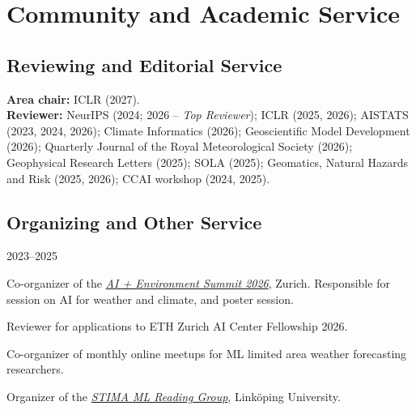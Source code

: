 \documentclass[11pt]{article}
\begin{document}
\section*{Community and Academic Service}
\subsection*{Reviewing and Editorial Service}
{\footnotesize
\textbf{Area chair:} ICLR (2027).\\
\textbf{Reviewer:} NeurIPS (2024; 2026 -- \textit{Top Reviewer}); ICLR (2025, 2026); AISTATS (2023, 2024, 2026); Climate Informatics (2026); Geoscientific Model Development (2026); Quarterly Journal of the Royal Meteorological Society (2026); Geophysical Research Letters (2025); SOLA (2025); Geomatics, Natural Hazards and Risk (2025, 2026); CCAI workshop (2024, 2025).
}

\subsection*{Organizing and Other Service}
{\footnotesize
\begin{labeling}{2023--2025}
    \item [2026] Co-organizer of the \href{https://ai-environment-summit.com/}{\textit{AI + Environment Summit 2026}}, Zurich. Responsible for session on AI for weather and climate, and poster session.
    \item [2025--2026] Reviewer for applications to ETH Zurich AI Center Fellowship 2026.
    \item [2023--2025] Co-organizer of monthly online meetups for ML limited area weather forecasting researchers.
    \item [2022--2025] Organizer of the \href{https://github.com/STIMALiU/ml-reading-group}{\textit{STIMA ML Reading Group}}, Linköping University.
\end{labeling}
}

\end{document}
